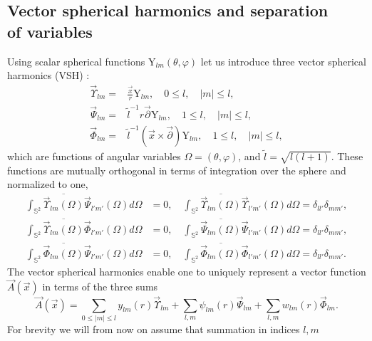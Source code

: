 \documentclass[12pt]{article}
\newcommand{\pl}{\partial}
\newcommand{\Sph}{\mathbb{S}}
\newcommand{\YY}{\mathrm{Y}}
\begin{document}
\subsection{Vector spherical harmonics and separation\\
	    of variables}
	Using  scalar spherical functions
$ \YY_{lm}(\theta,\varphi) $
	let us introduce three vector spherical harmonics (VSH)
\cite{VSH}:
\begin{align}
\label{VSH1}
    \vec{\Upsilon}_{lm} = & \frac{\vec{x}}{r} \YY_{lm} , \quad
        0 \leq l, \quad |m| \leq l, \\
    \vec{\Psi}_{lm} = & \tilde{l}^{-1} r \vec{\pl} \YY_{lm} , \quad
        1 \leq l , \quad |m| \leq l, \\
\label{VSH3}
    \vec{\Phi}_{lm} = & \tilde{l}^{-1} (\vec{x} \times \vec{\pl}) \YY_{lm},
        \quad 1 \leq l , \quad |m| \leq l ,
\end{align}
	which are functions of angular variables
$ \Omega = (\theta,\varphi) $, and
$ \tilde{l} = \sqrt{l(l+1)} $.
	These functions are mutually orthogonal in terms of integration over the sphere
	and normalized to one,
\begin{align*}
    \int_{\Sph^{2}} \overline{\vec{\Upsilon}_{lm}(\Omega)}
        \vec{\Psi}_{l'm'}(\Omega) d\Omega & = 0 ,\quad
    \int_{\Sph^{2}} \overline{\vec{\Upsilon}_{lm}(\Omega)}
        \vec{\Upsilon}_{l'm'}(\Omega) d\Omega = \delta_{ll'} \delta_{mm'} , \\
    \int_{\Sph^{2}} \overline{\vec{\Upsilon}_{lm}(\Omega)}
        \vec{\Phi}_{l'm'}(\Omega) d\Omega       & = 0 ,\quad
    \int_{\Sph^{2}} \overline{\vec{\Psi}_{lm}(\Omega)}
        \vec{\Psi}_{l'm'}(\Omega) d\Omega = \delta_{ll'} \delta_{mm'} , \\
    \int_{\Sph^{2}} \overline{\vec{\Phi}_{lm}(\Omega)}
        \vec{\Psi}_{l'm'}(\Omega) d\Omega & = 0 ,\quad
    \int_{\Sph^{2}} \overline{\vec{\Phi}_{lm}(\Omega)}
        \vec{\Phi}_{l'm'}(\Omega) d\Omega = \delta_{ll'} \delta_{mm'} .
\end{align*}
	The vector spherical harmonics enable one to uniquely represent
	a vector function
$ \vec{A}(\vec{x}) $
	in terms of the three sums
\begin{equation}
\label{fext}
    \vec{A}(\vec{x}) =
        \sum_{0\leq |m| \leq l} y_{lm}(r) \vec{\Upsilon}_{lm} +
        \sum_{l,m} \psi_{lm}(r) \vec{\Psi}_{lm} +
        \sum_{l,m} w_{lm}(r) \vec{\Phi}_{lm} .
\end{equation}
	For brevity we will from now on assume that summation in indices
$ l,m $
\end{document}
